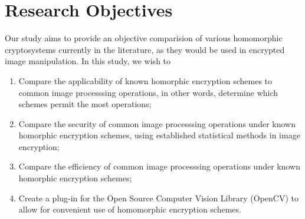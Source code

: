 \section{Research Objectives}
Our study aims to provide an objective comparision of various homomorphic cryptosystems currently in the literature, as they would be used in encrypted image manipulation.
In this study, we wish to
\begin{enumerate}
    \item Compare the applicability of known homorphic encryption schemes to common image processsing operations, in other words, determine which schemes permit the most operations;
		\item Compare the security of common image processsing operations under known homorphic encryption schemes, using established statistical methods in image encryption;
    \item Compare the efficiency of common image processsing operations under known homorphic encryption schemes;
    \item Create a plug-in for the Open Source Computer Vision Library (OpenCV) to allow for convenient use of homomorphic encryption schemes.
\end{enumerate}

